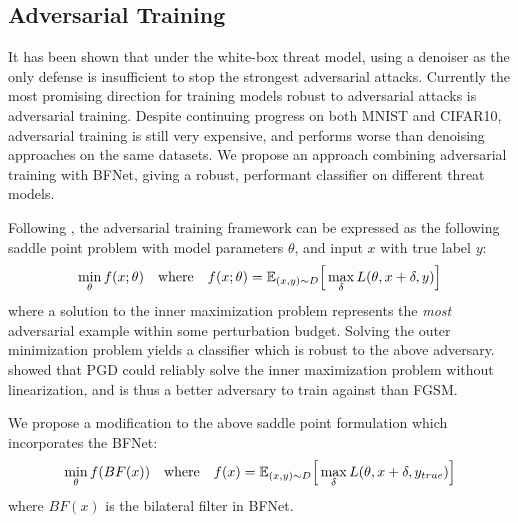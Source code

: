 \documentclass{article} %
\begin{document}
\subsection{Adversarial Training} 
It has been shown that under the white-box threat model, using a denoiser as the only defense is insufficient to stop the strongest adversarial attacks. 
Currently the most promising direction for training models robust to adversarial attacks is adversarial training. Despite continuing progress on both MNIST and CIFAR10, adversarial training is still very expensive, and performs worse than denoising approaches on the same datasets. We propose an approach combining adversarial training with BFNet, giving a robust, performant classifier on different threat models.

Following \citep{madry2017towards,athalye2018obfuscated,carlini2017towards}, the adversarial training framework can be expressed as the following saddle point problem with model parameters $\theta$, and input $x$ with true label $y$:
\[
\min_{\theta} f(x;\theta) \quad \textnormal{where} \quad f(x;\theta) = \mathbb{E}_{(x, y)\sim D} \Big[ \max_{\delta} L(\theta, x + \delta, y)\Big]
\]
where a solution to the inner maximization problem represents the \textit{most} adversarial example within some perturbation budget. Solving the outer minimization problem yields a classifier which is robust to the above adversary. \citep{madry2017towards} showed that PGD could reliably solve the inner maximization problem without linearization, and is thus a better adversary to train against than FGSM. 

We propose a modification to the above saddle point formulation which incorporates the BFNet:
\[
\min_{\theta} f(BF(x)) \quad \textnormal{where} \quad f(x) = \mathbb{E}_{(x, y)\sim D} \Big[ \max_{\delta} L(\theta, x + \delta, y_{true})\Big]
\]
where $BF(x)$ is the bilateral filter in BFNet.


\end{document}
